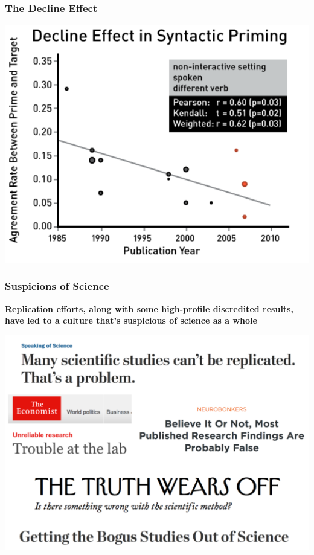 \documentclass[10pt, block=fill]{beamer}
\begin{document}
\begin{frame}
  \frametitle{The Decline Effect}

  \includegraphics[width=0.95\linewidth]{figures/decline_effect.png}
\end{frame}


\begin{frame}
  \frametitle{Suspicions of Science}
  
  \textbf{Replication efforts, along with some high-profile discredited results, have led to a culture that's suspicious of science as a whole}
  
  \begin{center}
    \includegraphics[width=.8\textwidth]{figures/news_headlines.png}
  \end{center}
    
\end{frame}
\end{document}
